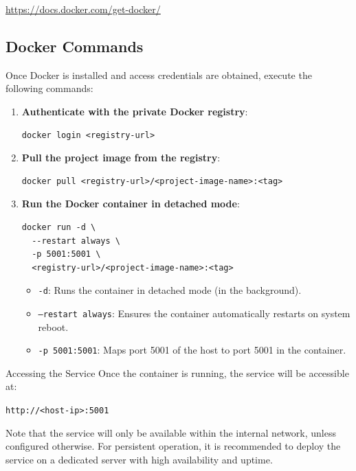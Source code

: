 \documentclass[11pt,a4paper]{article}
\begin{document}
\begin{center}
\url{https://docs.docker.com/get-docker/}
\end{center}

\subsection{Docker Commands}

Once Docker is installed and access credentials are obtained, execute the following commands:

\begin{enumerate}
    \item \textbf{Authenticate with the private Docker registry}:
    \begin{verbatim}
docker login <registry-url>
    \end{verbatim}

    \item \textbf{Pull the project image from the registry}:
    \begin{verbatim}
docker pull <registry-url>/<project-image-name>:<tag>
    \end{verbatim}

    \item \textbf{Run the Docker container in detached mode}:
    \begin{verbatim}
docker run -d \
  --restart always \
  -p 5001:5001 \
  <registry-url>/<project-image-name>:<tag>
    \end{verbatim}
    \begin{itemize}
        \item \texttt{-d}: Runs the container in detached mode (in the background).
        \item \texttt{--restart always}: Ensures the container automatically restarts on system reboot.
        \item \texttt{-p 5001:5001}: Maps port 5001 of the host to port 5001 in the container.
    \end{itemize}
\end{enumerate}

{Accessing the Service}
Once the container is running, the service will be accessible at:

\begin{center}
\texttt{http://<host-ip>:5001}
\end{center}

Note that the service will only be available within the internal network, unless configured otherwise. For persistent operation, it is recommended to deploy the service on a dedicated server with high availability and uptime.
\end{document}
